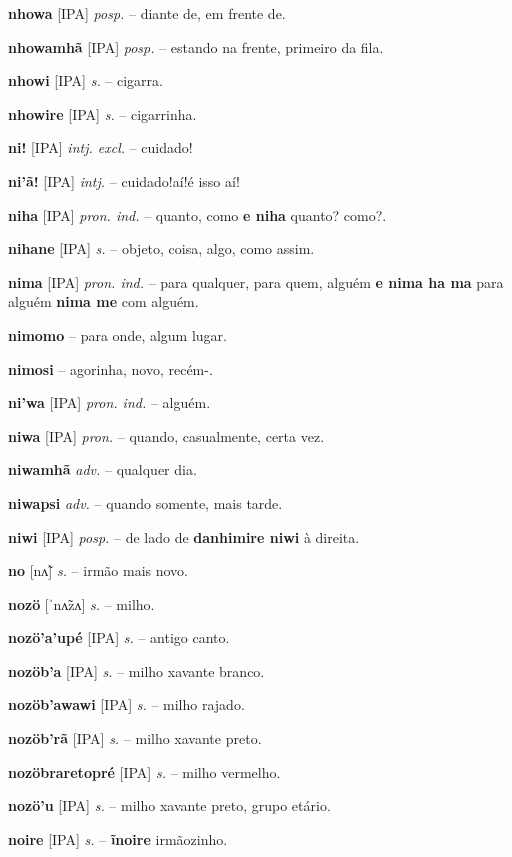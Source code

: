\textbf{nhowa} [IPA] \textit{posp.} -- diante de, em frente de.

\textbf{nhowamhã} [IPA] \textit{posp.} -- estando na frente, primeiro da fila.

\textbf{nhowi} [IPA] \textit{s.} -- cigarra.

\textbf{nhowire} [IPA] \textit{s.} -- cigarrinha.

\textbf{ni!} [IPA] \textit{intj. excl.} -- cuidado!

\textbf{ni'ã!} [IPA] \textit{intj.} -- cuidado!aí!é isso aí!

\textbf{niha} [IPA] \textit{pron. ind.} -- quanto, como  \textbf{e niha} quanto? como?.

\textbf{nihane} [IPA] \textit{s.} -- objeto, coisa, algo, como assim.

\textbf{nima} [IPA] \textit{pron. ind.} -- para qualquer, para quem, alguém  \textbf{e nima ha ma} para alguém  \textbf{nima me} com alguém.

\textbf{nimomo} -- para onde, algum lugar.

\textbf{nimosi} -- agorinha, novo, recém-.

\textbf{ni'wa} [IPA] \textit{pron. ind.} -- alguém.

\textbf{niwa} [IPA] \textit{pron.} -- quando, casualmente, certa vez.

\textbf{niwamhã} \textit{adv.} -- qualquer dia.

\textbf{niwapsi} \textit{adv.} -- quando somente, mais tarde.

\textbf{niwi} [IPA] \textit{posp.} -- de lado de  \textbf{danhimire niwi} à direita.

\textbf{no} [nʌ̃] \textit{s.} -- irmão mais novo.

\textbf{nozö} [ˈnʌ̃zʌ] \textit{s.} -- milho.

\textbf{nozö'a'upé} [IPA] \textit{s.} -- antigo canto.

\textbf{nozöb'a} [IPA] \textit{s.} -- milho xavante branco.

\textbf{nozöb'awawi} [IPA] \textit{s.} -- milho rajado.

\textbf{nozöb'rã} [IPA] \textit{s.} -- milho xavante preto.

\textbf{nozöbraretopré} [IPA] \textit{s.} -- milho vermelho.

\textbf{nozö'u} [IPA] \textit{s.} -- milho xavante preto, grupo etário.

\textbf{noire} [IPA] \textit{s.} -- \textbf{ĩnoire} irmãozinho.

